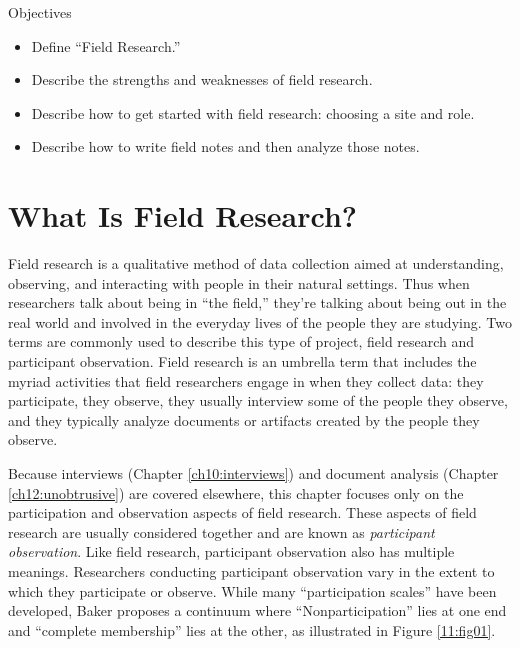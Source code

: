 \begin{center}
	\begin{objbox}{Objectives}
		\begin{itemize}
			\setlength{\itemsep}{0pt}
			\setlength{\parskip}{0pt}
			\setlength{\parsep}{0pt}
			
			\item Define ``Field Research.''
			\item Describe the strengths and weaknesses of field research.
			\item Describe how to get started with field research: choosing a site and role.
			\item Describe how to write field notes and then analyze those notes.
		\end{itemize}
	\end{objbox}
\end{center}


\section{What Is Field Research?}

Field research is a qualitative method of data collection aimed at understanding, observing, and interacting with people in their natural settings. Thus when researchers talk about being in ``the field,'' they're talking about being out in the real world and involved in the everyday lives of the people they are studying. Two terms are commonly used to describe this type of project, field research and participant observation. Field research is an umbrella term that includes the myriad activities that field researchers engage in when they collect data: they participate, they observe, they usually interview some of the people they observe, and they typically analyze documents or artifacts created by the people they observe.

Because interviews (Chapter \ref{ch10:interviews}) and document analysis (Chapter \ref{ch12:unobtrusive}) are covered elsewhere, this chapter focuses only on the participation and observation aspects of field research. These aspects of field research are usually considered together and are known as \textit{participant observation}. Like field research, participant observation also has multiple meanings. Researchers conducting participant observation vary in the extent to which they participate or observe\cite{baker2006observation}. While many ``participation scales'' have been developed, Baker proposes a continuum where ``Nonparticipation'' lies at one end and ``complete membership'' lies at the other, as illustrated in Figure \ref{11:fig01}.\label{11:continuum}

